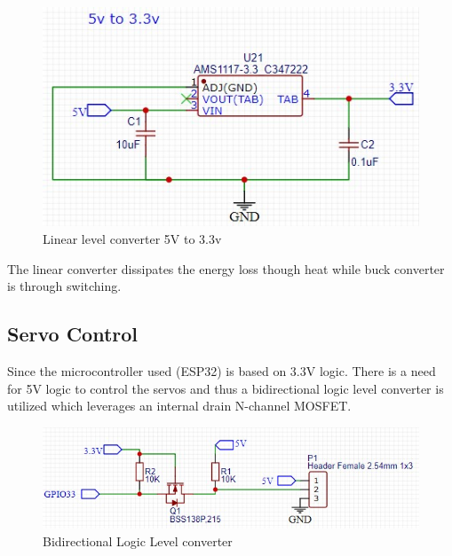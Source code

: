 \begin{center}
	\begin{figure}[!h]
	\centering
	\includegraphics{Figures/5233}
	\caption[Linear Voltage Converter]{Linear level converter 5V to 3.3v}
	\end{figure}
\end{center}

The linear converter dissipates the energy loss though heat while buck converter is through switching.

\subsection{Servo Control}
Since the microcontroller used (ESP32) is based on 3.3V logic. There is a need for 5V logic to control the servos and thus a bidirectional logic level converter is utilized which leverages an internal drain N-channel MOSFET. 
\begin{center}
	\begin{figure}[!h]
	\centering
	\includegraphics{Figures/logik}
	\caption[Bidirectional Logic Level converter]{Bidirectional Logic Level converter}
	\end{figure}
\end{center}
